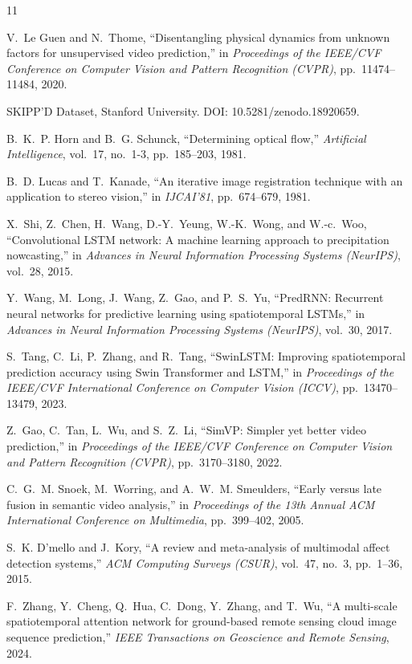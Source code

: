 \documentclass[11pt,a4paper]{article}
\begin{document}

\begin{thebibliography}{11}

V.~Le Guen and N.~Thome,
``Disentangling physical dynamics from unknown factors for unsupervised video prediction,''
in \emph{Proceedings of the IEEE/CVF Conference on Computer Vision and Pattern Recognition (CVPR)}, pp.~11474--11484, 2020.

SKIPP'D Dataset, Stanford University.
DOI: 10.5281/zenodo.18920659.

B.~K.~P. Horn and B.~G. Schunck,
``Determining optical flow,''
\emph{Artificial Intelligence}, vol.~17, no.~1-3, pp.~185--203, 1981.

B.~D. Lucas and T.~Kanade,
``An iterative image registration technique with an application to stereo vision,''
in \emph{IJCAI'81}, pp.~674--679, 1981.

X.~Shi, Z.~Chen, H.~Wang, D.-Y.~Yeung, W.-K.~Wong, and W.-c.~Woo,
``Convolutional {LSTM} network: A machine learning approach to precipitation nowcasting,''
in \emph{Advances in Neural Information Processing Systems (NeurIPS)}, vol.~28, 2015.

Y.~Wang, M.~Long, J.~Wang, Z.~Gao, and P.~S.~Yu,
``{PredRNN}: Recurrent neural networks for predictive learning using spatiotemporal {LSTMs},''
in \emph{Advances in Neural Information Processing Systems (NeurIPS)}, vol.~30, 2017.

S.~Tang, C.~Li, P.~Zhang, and R.~Tang,
``{SwinLSTM}: Improving spatiotemporal prediction accuracy using {Swin} {Transformer} and {LSTM},''
in \emph{Proceedings of the IEEE/CVF International Conference on Computer Vision (ICCV)}, pp.~13470--13479, 2023.

Z.~Gao, C.~Tan, L.~Wu, and S.~Z.~Li,
``{SimVP}: Simpler yet better video prediction,''
in \emph{Proceedings of the IEEE/CVF Conference on Computer Vision and Pattern Recognition (CVPR)}, pp.~3170--3180, 2022.

C.~G.~M. Snoek, M.~Worring, and A.~W.~M. Smeulders,
``Early versus late fusion in semantic video analysis,''
in \emph{Proceedings of the 13th Annual ACM International Conference on Multimedia}, pp.~399--402, 2005.

S.~K. D'mello and J.~Kory,
``A review and meta-analysis of multimodal affect detection systems,''
\emph{ACM Computing Surveys (CSUR)}, vol.~47, no.~3, pp.~1--36, 2015.

F.~Zhang, Y.~Cheng, Q.~Hua, C.~Dong, Y.~Zhang, and T.~Wu,
``A multi-scale spatiotemporal attention network for ground-based remote sensing cloud image sequence prediction,''
\emph{IEEE Transactions on Geoscience and Remote Sensing}, 2024.

\end{thebibliography}
\end{document}
